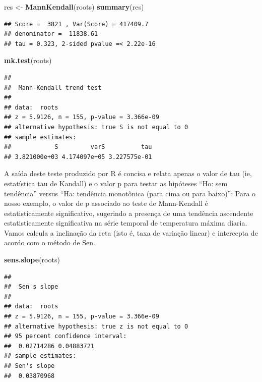 \documentclass[
]{book}
\newenvironment{Shaded}{\begin{snugshade}}{\end{snugshade}}
\newcommand{\KeywordTok}[1]{\textcolor[rgb]{0.13,0.29,0.53}{\textbf{#1}}}
\newcommand{\NormalTok}[1]{#1}
\newcommand{\StringTok}[1]{\textcolor[rgb]{0.31,0.60,0.02}{#1}}
\begin{document}
\begin{Shaded}
\begin{Highlighting}[]
\NormalTok{res <-}\StringTok{ }\KeywordTok{MannKendall}\NormalTok{(roots)}
\KeywordTok{summary}\NormalTok{(res)}
\end{Highlighting}
\end{Shaded}

\begin{verbatim}
## Score =  3821 , Var(Score) = 417409.7
## denominator =  11838.61
## tau = 0.323, 2-sided pvalue =< 2.22e-16
\end{verbatim}

\begin{Shaded}
\begin{Highlighting}[]
\KeywordTok{mk.test}\NormalTok{(roots)}
\end{Highlighting}
\end{Shaded}

\begin{verbatim}
## 
##  Mann-Kendall trend test
## 
## data:  roots
## z = 5.9126, n = 155, p-value = 3.366e-09
## alternative hypothesis: true S is not equal to 0
## sample estimates:
##            S         varS          tau 
## 3.821000e+03 4.174097e+05 3.227575e-01
\end{verbatim}

A saída deste teste produzido por R é concisa e relata apenas o valor de tau (ie, estatística tau de Kandall) e o valor p para testar as hipóteses
``Ho: sem tendência'' versus ``Ha: tendência monotônica (para cima ou para baixo)'':
Para o nosso exemplo, o valor de p associado ao teste de Mann-Kendall é estatisticamente significativo, sugerindo a presença de uma tendência ascendente estatisticamente significativa na série temporal de temperatura máxima diaria.
Vamos calcula a inclinação da reta (isto é, taxa de variação linear) e intercepta de acordo com o método de Sen.

\begin{Shaded}
\begin{Highlighting}[]
\KeywordTok{sens.slope}\NormalTok{(roots)}
\end{Highlighting}
\end{Shaded}

\begin{verbatim}
## 
##  Sen's slope
## 
## data:  roots
## z = 5.9126, n = 155, p-value = 3.366e-09
## alternative hypothesis: true z is not equal to 0
## 95 percent confidence interval:
##  0.02714286 0.04883721
## sample estimates:
## Sen's slope 
##  0.03870968
\end{verbatim}
\end{document}

